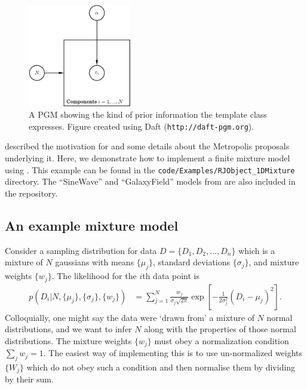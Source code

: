 \documentclass[article]{jss}
\begin{document}
\begin{figure}[ht!]
\begin{center}
\hspace*{-2cm}\includegraphics[width=0.4\textwidth]{figures/rjobject_pgm.pdf}
\caption{A PGM showing the kind of prior information the 
template class expresses.
Figure created using Daft ({\tt http://daft-pgm.org}).\label{fig:rjobject_pgm}}
\end{center}
\end{figure}

\citet{rjobject} described the motivation for  and some details
about the Metropolis proposals underlying it. Here, we demonstrate how to
implement a finite mixture model using .
This example can be found in the
{\tt code/Examples/RJObject\_1DMixture}
directory. The ``SineWave'' and ``GalaxyField'' models
from \citet{rjobject} are also included in the  repository.

\subsection{An example mixture model}
Consider a sampling distribution
for data $D=\{D_1, D_2, ..., D_n\}$ which is a mixture of $N$ gaussians
with means $\{\mu_j\}$, standard deviations $\{\sigma_j\}$, and
mixture weights $\{w_j\}$. The likelihood for the $i$th data point is
\begin{align}
p\left(D_i | N, \{\mu_j\}, \{\sigma_j\}, \{w_j\}\right) &=
\sum_{j=1}^N \frac{w_j}{\sigma_j\sqrt{2\pi}}
\exp\left[-\frac{1}{2\sigma_j^2}\left(D_i - \mu_j\right)^2\right].
\end{align}
Colloquially, one might say the data were `drawn from' a mixture of
$N$ normal distributions, and we want to infer $N$ along with the
properties of those normal distributions.
The mixture weights $\{w_j\}$ must obey a normalization condition
$\sum_j w_j = 1$. The easiest way of implementing this is to use
un-normalized weights $\{W_j\}$ which do not obey
such a condition and then normalise them by dividing by their sum.
\end{document}
